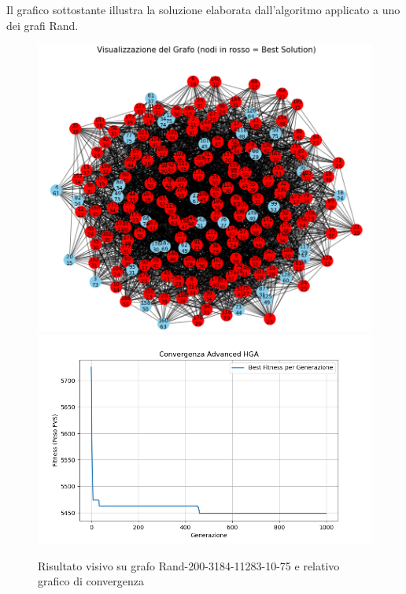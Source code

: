 \documentclass[12pt,a4paper,twoside]{article}
\begin{document}
Il grafico sottostante illustra la soluzione elaborata dall'algoritmo applicato a uno dei grafi Rand.
\begin{figure}[H] 
    \centering
    \caption{Risultato visivo su grafo Rand-200-3184-11283-10-75 e relativo grafico di convergenza }
    \includegraphics[width=\textwidth]{Screenshot 2025-03-03 210242.png} 
    \vspace{2pt} 
    \includegraphics[width=\textwidth]{convergence.png} 
\end{figure}
\end{document}
